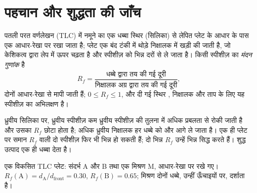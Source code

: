 \section{पहचान और शुद्धता की जाँच}

\begin{definition}[मंदन गुणांक]\label{def:b1:lab-techniques-1:retention-factor}
पतली परत वर्णलेखन (TLC) में नमूने का एक धब्बा
स्थिर  (सिलिका) से लेपित प्लेट के आधार के पास एक आधार-रेखा पर
रखा जाता है; प्लेट एक बंद टंकी में थोड़े निक्षालक में खड़ी की जाती है, जो
केशिकत्व द्वारा लेप में ऊपर चढ़ता है और स्पीशीज़ को
भिन्न दरों से ले जाता है। किसी स्पीशीज़ का \emph{मंदन गुणांक}
है
\[
  R_f = \frac{\text{धब्बे द्वारा तय की गई दूरी}}
             {\text{निक्षालक अग्र द्वारा तय की गई दूरी}},
\]
दोनों आधार-रेखा से मापी जाती हैं; $0 \le R_f \le 1$, और दी गई
स्थिर , निक्षालक और ताप के लिए यह स्पीशीज़ का अभिलक्षण है।
\end{definition}

ध्रुवीय सिलिका पर, ध्रुवीय स्पीशीज़ कम
ध्रुवीय स्पीशीज़ की तुलना में अधिक प्रबलता से रोकी जाती है और उसका $R_f$ छोटा होता है; अधिक ध्रुवीय निक्षालक हर धब्बे को
और आगे ले जाता है। एक ही प्लेट पर समान $R_f$ वाली दो स्पीशीज़ फिर भी भिन्न हो सकती हैं;
दो भिन्न $R_f$ उन्हें भिन्न सिद्ध करते हैं। शुद्ध उत्पाद एक ही
धब्बा देता है।

\begin{omfigure}

{\small एक विकसित TLC प्लेट: संदर्भ A और B तथा एक मिश्रण M,
आधार-रेखा पर रखे गए। $R_f(\mathrm{A}) = d_{\mathrm{A}}/d_{\mathrm{front}}
= 0.30$, $R_f(\mathrm{B}) = 0.65$; मिश्रण दोनों धब्बे, उन्हीं
ऊँचाइयों पर, दर्शाता है।}
\end{omfigure}


